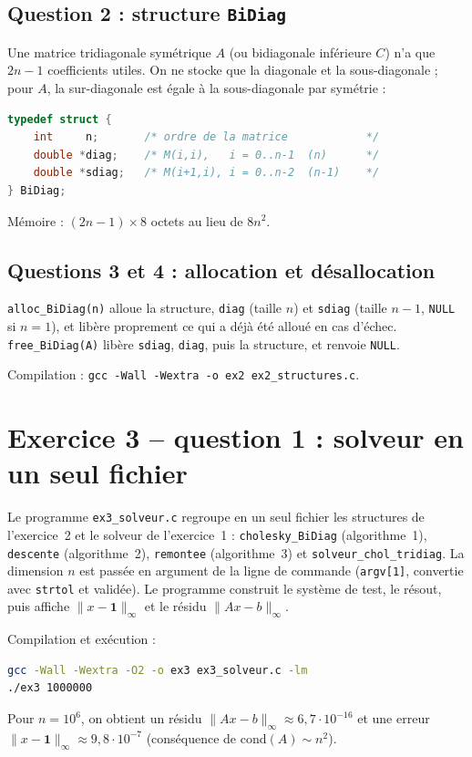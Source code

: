 \documentclass[11pt,a4paper]{article}
\begin{document}
\subsection{Question 2 : structure \texttt{BiDiag}}
Une matrice tridiagonale symétrique $A$ (ou bidiagonale inférieure $C$) n'a que $2n-1$ coefficients utiles.
On ne stocke que la diagonale et la sous-diagonale ; pour $A$, la sur-diagonale est égale à la sous-diagonale par symétrie :
\begin{lstlisting}[language=C]
typedef struct {
    int     n;       /* ordre de la matrice            */
    double *diag;    /* M(i,i),   i = 0..n-1  (n)      */
    double *sdiag;   /* M(i+1,i), i = 0..n-2  (n-1)    */
} BiDiag;
\end{lstlisting}
Mémoire : $(2n-1)\times 8$ octets au lieu de $8n^2$.

\subsection{Questions 3 et 4 : allocation et désallocation}
\texttt{alloc\_BiDiag(n)} alloue la structure, \texttt{diag} (taille $n$) et \texttt{sdiag} (taille $n-1$, \texttt{NULL} si $n=1$),
et libère proprement ce qui a déjà été alloué en cas d'échec. \texttt{free\_BiDiag(A)} libère
\texttt{sdiag}, \texttt{diag}, puis la structure, et renvoie \texttt{NULL}.



\noindent Compilation : \texttt{gcc -Wall -Wextra -o ex2 ex2\_structures.c}.

\section{Exercice 3 -- question 1 : solveur en un seul fichier}

Le programme \texttt{ex3\_solveur.c} regroupe en un seul fichier les structures de l'exercice~2 et le solveur de
l'exercice~1 : \texttt{cholesky\_BiDiag} (algorithme~1), \texttt{descente} (algorithme~2), \texttt{remontee}
(algorithme~3) et \texttt{solveur\_chol\_tridiag}. La dimension $n$ est passée en argument de la ligne de commande
(\texttt{argv[1]}, convertie avec \texttt{strtol} et validée). Le programme construit le système de test, le résout,
puis affiche $\|x-\mathbf 1\|_\infty$ et le résidu $\|Ax-b\|_\infty$.



\noindent Compilation et exécution :
\begin{lstlisting}[language=bash,numbers=none]
gcc -Wall -Wextra -O2 -o ex3 ex3_solveur.c -lm
./ex3 1000000
\end{lstlisting}
Pour $n=10^6$, on obtient un résidu $\|Ax-b\|_\infty\approx 6{,}7\cdot10^{-16}$ et une erreur
$\|x-\mathbf 1\|_\infty\approx 9{,}8\cdot10^{-7}$ (conséquence de $\mathrm{cond}(A)\sim n^2$).
\end{document}
